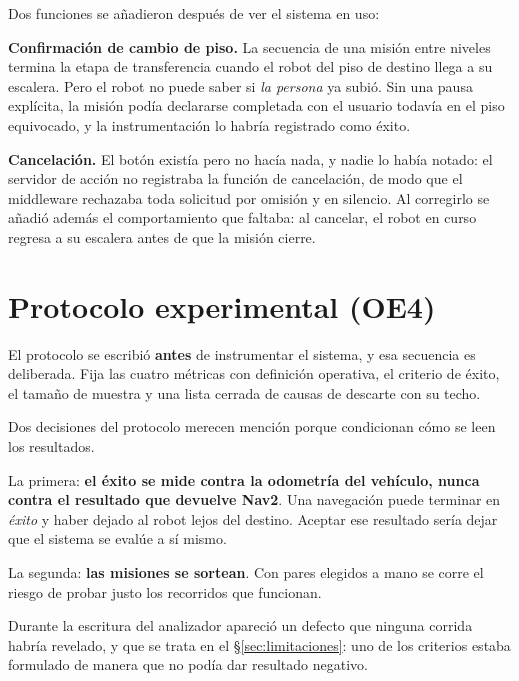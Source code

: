 Dos funciones se añadieron después de ver el sistema en uso:

\textbf{Confirmación de cambio de piso.} La secuencia de una misión entre niveles
termina la etapa de transferencia cuando el robot del piso de destino llega a su
escalera. Pero el robot no puede saber si \emph{la persona} ya subió. Sin una
pausa explícita, la misión podía declararse completada con el usuario todavía en
el piso equivocado, y la instrumentación lo habría registrado como éxito.

\textbf{Cancelación.} El botón existía pero no hacía nada, y nadie lo había
notado: el servidor de acción no registraba la función de cancelación, de modo
que el middleware rechazaba toda solicitud por omisión y en silencio. Al
corregirlo se añadió además el comportamiento que faltaba: al cancelar, el robot
en curso regresa a su escalera antes de que la misión cierre.

\section{Protocolo experimental (OE4)}

El protocolo se escribió \textbf{antes} de instrumentar el sistema, y esa
secuencia es deliberada. Fija las cuatro métricas con definición operativa, el
criterio de éxito, el tamaño de muestra y una lista cerrada de causas de
descarte con su techo.

Dos decisiones del protocolo merecen mención porque condicionan cómo se leen los
resultados.

La primera: \textbf{el éxito se mide contra la odometría del vehículo, nunca
contra el resultado que devuelve Nav2}. Una navegación puede terminar en
\emph{éxito} y haber dejado al robot lejos del destino. Aceptar ese resultado
sería dejar que el sistema se evalúe a sí mismo.

La segunda: \textbf{las misiones se sortean}. Con pares elegidos a mano se corre
el riesgo de probar justo los recorridos que funcionan.

Durante la escritura del analizador apareció un defecto que ninguna corrida
habría revelado, y que se trata en el §\ref{sec:limitaciones}: uno de los
criterios estaba formulado de manera que no podía dar resultado negativo.
